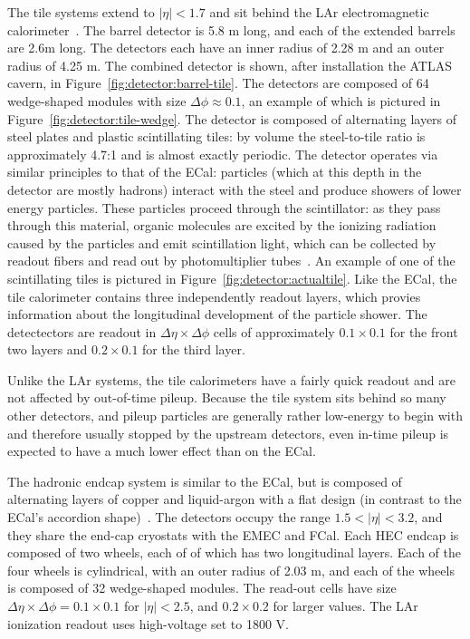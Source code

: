 The tile systems extend to $|\eta| < 1.7$ and sit behind the LAr electromagnetic calorimeter~\cite{ATLASPaper,Tile}. The barrel detector is 5.8 m long, and each of the extended barrels are 2.6m long. The detectors each have an inner radius of 2.28 m and an outer radius of 4.25 m. The combined detector is shown, after installation the ATLAS cavern, in Figure~\ref{fig:detector:barrel-tile}. The detectors are composed of 64 wedge-shaped modules with size $\Delta\phi \approx 0.1$, an example of which is pictured in Figure~\ref{fig:detector:tile-wedge}. The detector is composed of alternating layers of steel plates and plastic scintillating tiles: by volume the steel-to-tile ratio is approximately 4.7:1 and is almost exactly periodic. The detector operates via similar principles to that of the ECal: particles (which at this depth in the detector are mostly hadrons) interact with the steel and produce showers of lower energy particles. These particles proceed through the scintillator: as they pass through this material, organic molecules are excited by the ionizing radiation caused by the particles and emit scintillation light, which can be collected by readout fibers and read out by photomultiplier tubes~\cite{Wigmans,Detectors,Tile}.  An example of one of the scintillating tiles is pictured in Figure~\ref{fig:detector:actualtile}. Like the ECal, the tile calorimeter contains three independently readout layers, which provies information about the longitudinal development of the particle shower. The detectectors are readout in $\Delta \eta \times \Delta\phi$ cells of approximately  $0.1 \times 0.1$ for the front two layers  and $0.2 \times 0.1$ for the third layer.

Unlike the LAr systems, the tile calorimeters have a fairly quick readout and are not affected by out-of-time pileup. Because the tile system sits behind so many other detectors, and pileup particles are generally rather low-energy to begin with and therefore usually stopped by the upstream detectors, even in-time pileup is expected to have a much lower effect than on the ECal.

The hadronic endcap system is similar to the ECal, but is composed of alternating layers of copper and liquid-argon with a flat design (in contrast to the ECal's accordion shape)~\cite{ATLASPaper}. The detectors occupy the range $1.5 < |\eta| < 3.2$, and they share the end-cap cryostats with the EMEC and FCal.  Each HEC endcap is composed of two wheels, each of of which has two longitudinal layers. Each of the four wheels is cylindrical, with an outer radius of 2.03 m, and each of the wheels is composed of 32 wedge-shaped modules. The read-out cells have size $\Delta \eta \times \Delta\phi = 0.1 \times 0.1$ for $|\eta| < 2.5$, and $0.2 \times 0.2$ for larger values. The LAr ionization readout uses high-voltage set to 1800 V.

